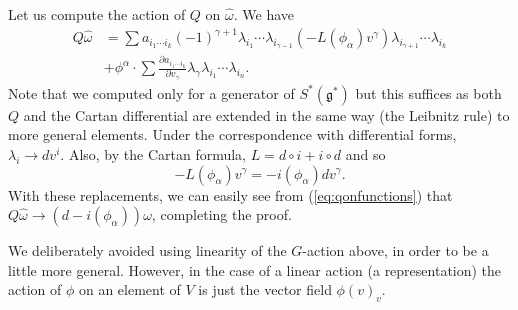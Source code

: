 \documentclass[twoside]{amsart}
\renewcommand{\eqref}[1]{(\ref{eq:#1})}
\newcommand{\enm}[1]{\ensuremath{#1}}
\newcommand{\g}{\enm{\mathfrak{g}}}
\begin{document}
Let us compute the action of \( Q \) on \( \hat{\omega}. \)  We have
\begin{align}
    Q\hat{\omega}
    &= \sum a_{i_{1}\cdots
    i_{k}}(-1)^{\gamma+1}
    \lambda_{i_{1}}\cdots\lambda_{i_{\gamma-1}}
    (-L(\phi_{\alpha})v^{\gamma})
    \lambda_{i_{\gamma+1}}\cdots
    \lambda_{i_{k}} \nonumber\\
    &+ \phi^{\alpha}\cdot\sum
    \frac{\partial a_{i_{1}\cdots i_{k}}}{\partial v_{\gamma}}
    \lambda_{\gamma}\lambda_{i_{1}}\cdots
\lambda_{i_{n}}\label{eq:qonfunctions}.
\end{align}
Note that we computed only for a generator of \( S^{*}(\g^{*}) \) but
this suffices as both \( Q \) and the Cartan differential are
extended
in the same way (the Leibnitz rule) to more general elements.
Under the correspondence with differential forms, \( \lambda_{i}\to
dv^{i}
\).  Also, by the Cartan formula, \( L = d\circ i + i\circ d \) and
so
\[ -L(\phi_{\alpha})v^{\gamma} = -i(\phi_{\alpha})dv^{\gamma}. \]
With these replacements, we can easily see from \eqref{qonfunctions}
that \( Q\hat{\omega} \to
(d-i(\phi_{\alpha}))\omega \), completing the proof.

We deliberately avoided using linearity of the \( G \)-action above,
in order to be a little more general.  However, in the case of a
linear action (a representation) the action of \( \phi \)
on an element of \( V \) is just the vector field
\( \phi(v)_{v} \).
\end{document}
